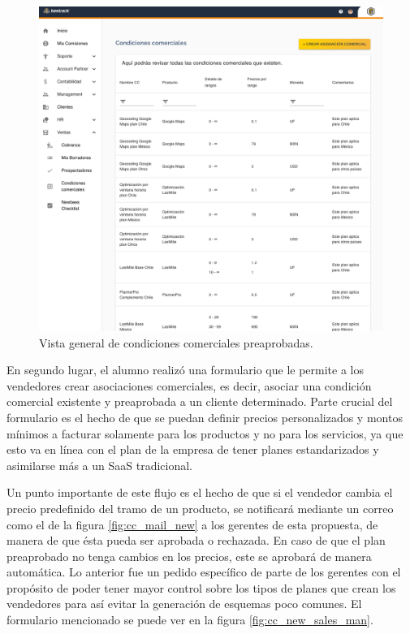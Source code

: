     \begin{figure}[H]
      \centering
      \includegraphics[width=0.8\linewidth]{figures/cc/vistas/cc_visible.png}
      \caption{Vista general de condiciones comerciales preaprobadas.}
      \label{fig:cc_visible}
    \end{figure}

    En segundo lugar, el alumno realizó una formulario que le permite a los vendedores crear asociaciones comerciales, es decir, asociar una condición comercial existente y preaprobada a un cliente determinado. Parte crucial del formulario es el hecho de que se puedan definir precios personalizados y montos mínimos a facturar solamente para los productos y no para los servicios, ya que esto va en línea con el plan de la empresa de tener planes estandarizados y asimilarse más a un SaaS tradicional. 
    
    Un punto importante de este flujo es el hecho de que si el vendedor cambia el precio predefinido del tramo de un producto, se notificará mediante un correo como el de la figura \ref{fig:cc_mail_new} a los gerentes de esta propuesta, de manera de que ésta pueda ser aprobada o rechazada. En caso de que el plan preaprobado no tenga cambios en los precios, este se aprobará de manera automática. Lo anterior fue un pedido específico de parte de los gerentes con el propósito de poder tener mayor control sobre los tipos de planes que crean los vendedores para así evitar la generación de esquemas poco comunes. El formulario mencionado se puede ver en la figura \ref{fig:cc_new_sales_man}.

